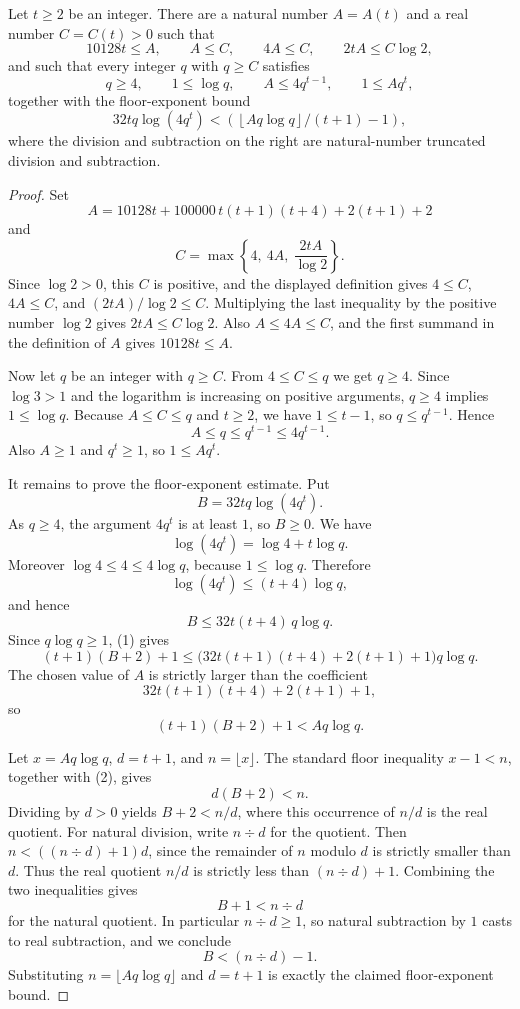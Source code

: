 \begin{helper}
Let \(t\ge2\) be an integer.  There are a natural number \(A=A(t)\) and a
real number \(C=C(t)>0\) such that
\[
  10128t\le A,\qquad A\le C,\qquad 4A\le C,\qquad 2tA\le C\log 2,
\]
and such that every integer \(q\) with \(q\ge C\) satisfies
\[
  q\ge4,\qquad 1\le\log q,\qquad A\le 4q^{t-1},\qquad 1\le Aq^t,
\]
together with the floor-exponent bound
\[
  32tq\log(4q^t)
  <
  \left(\left\lfloor Aq\log q\right\rfloor/(t+1)-1\right),
\]
where the division and subtraction on the right are natural-number truncated
division and subtraction.
\end{helper}
\begin{proof}
Set
\[
  A=
  10128t+100000\,t(t+1)(t+4)+2(t+1)+2
\]
and
\[
  C=\max\left\{4,\ 4A,\ \frac{2tA}{\log2}\right\}.
\]
Since \(\log2>0\), this \(C\) is positive, and the displayed definition gives
\(4\le C\), \(4A\le C\), and \((2tA)/\log2\le C\).  Multiplying the last
inequality by the positive number \(\log2\) gives \(2tA\le C\log2\).  Also
\(A\le4A\le C\), and the first summand in the definition of \(A\) gives
\(10128t\le A\).

Now let \(q\) be an integer with \(q\ge C\).  From \(4\le C\le q\) we get
\(q\ge4\).  Since \(\log3>1\) and the logarithm is increasing on positive
arguments, \(q\ge4\) implies \(1\le\log q\).  Because \(A\le C\le q\) and
\(t\ge2\), we have \(1\le t-1\), so \(q\le q^{t-1}\).  Hence
\[
  A\le q\le q^{t-1}\le4q^{t-1}.
\]
Also \(A\ge1\) and \(q^t\ge1\), so \(1\le Aq^t\).

It remains to prove the floor-exponent estimate.  Put
\[
  B=32tq\log(4q^t).
\]
As \(q\ge4\), the argument \(4q^t\) is at least \(1\), so \(B\ge0\).  We have
\[
  \log(4q^t)=\log4+t\log q.
\]
Moreover \(\log4\le4\le4\log q\), because \(1\le\log q\).  Therefore
\[
  \log(4q^t)\le(t+4)\log q,
\]
and hence
\[
  B\le 32t(t+4)\,q\log q. \tag{1}
\]
Since \(q\log q\ge1\), (1) gives
\[
  (t+1)(B+2)+1
  \le
  \bigl(32t(t+1)(t+4)+2(t+1)+1\bigr)q\log q.
\]
The chosen value of \(A\) is strictly larger than the coefficient
\[
  32t(t+1)(t+4)+2(t+1)+1,
\]
so
\[
  (t+1)(B+2)+1<Aq\log q. \tag{2}
\]

Let \(x=Aq\log q\), \(d=t+1\), and \(n=\lfloor x\rfloor\).  The standard
floor inequality \(x-1<n\), together with (2), gives
\[
  d(B+2)<n.
\]
Dividing by \(d>0\) yields \(B+2<n/d\), where this occurrence of \(n/d\) is
the real quotient.  For natural division, write \(n\div d\) for the quotient.
Then \(n<((n\div d)+1)d\), since the remainder of \(n\) modulo \(d\) is
strictly smaller than \(d\).  Thus the real quotient \(n/d\) is strictly less
than \((n\div d)+1\).  Combining the two inequalities gives
\[
  B+1< n\div d
\]
for the natural quotient.  In particular \(n\div d\ge1\), so natural
subtraction by \(1\) casts to real subtraction, and we conclude
\[
  B< (n\div d)-1.
\]
Substituting \(n=\lfloor Aq\log q\rfloor\) and \(d=t+1\) is exactly the
claimed floor-exponent bound.
\end{proof}
